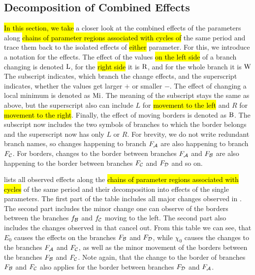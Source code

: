 \subsection{Decomposition of Combined Effects}
\label{sec:yunus.param.effects.decomposition}

\hl{In this section, we take} a closer look at the combined effects of the parameters along \hl{chains of parameter regions associated with cycles of} the same period and trace them back to the isolated effects of \hl{either} parameter.
For this, we introduce a notation for the effects.
The effect of the values \hl{on the left side} of a branch changing is denoted $\operatorname{L}$, for the \hl{right side} it is $\operatorname{R}$, and for the whole branch it is $\operatorname{W}$
The subscript indicates, which branch the change effects, and the superscript indicates, whether the values get larger $+$ or smaller $-$.
The effect of changing a local minimum is denoted as $\operatorname{Mi}$.
The meaning of the subscript stays the same as above, but the superscript also can include $L$ for \hl{movement to the left} and $R$ for \hl{movement to the right}.
Finally, the effect of moving borders is denoted as $\operatorname{B}$.
The subscript now includes the two symbols of branches to which the border belongs and the superscript now has only $L$ or $R$.
For brevity, we do not write redundant branch names, so changes happening to branch $F_{\mathcal{A}}$ are also happening to branch $F_{\mathcal{C}}$.
For borders, changes to the border between branches $F_{\mathcal{A}}$ and $F_{\mathcal{B}}$ are also happening to the border between branches $F_{\mathcal{C}}$ and $F_{\mathcal{D}}$ and so on.

 lists all observed effects along the \hl{chains of parameter regions associated with cycles} of the same period and their decomposition into effects of the single parameters.
The first part of the table includes all major changes observed in .
The second part includes the minor change one can observe of the borders between the branches $f_{\mathcal{B}}$ and $f_{\mathcal{C}}$ moving to the left.
The second part also includes the changes observed in  that cancel out.
From this table we can see, that $E_0$ causes the effects on the branches $F_{\mathcal{B}}$ and $F_{\mathcal{D}}$, while $\chi_0$ causes the changes to the branches $F_{\mathcal{A}}$ and $F_{\mathcal{C}}$, as well as the minor movement of the borders between the branches $F_{\mathcal{B}}$ and $F_{\mathcal{C}}$.
Note again, that the change to the border of branches $F_{\mathcal{B}}$ and $F_{\mathcal{C}}$ also applies for the border between branches $F_{\mathcal{D}}$ and $F_{\mathcal{A}}$.


